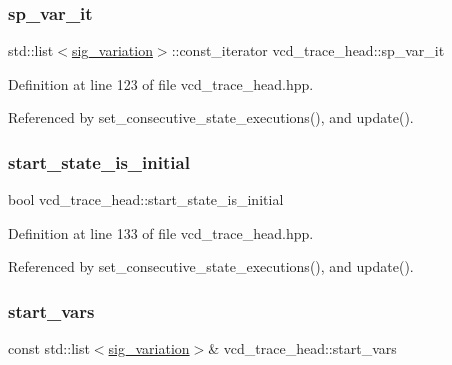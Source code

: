 \subsubsection{\texorpdfstring{sp\+\_\+var\+\_\+it}{sp\_var\_it}}
{\footnotesize\ttfamily std\+::list$<$\hyperlink{structsig__variation}{sig\+\_\+variation}$>$\+::const\+\_\+iterator vcd\+\_\+trace\+\_\+head\+::sp\+\_\+var\+\_\+it}



Definition at line 123 of file vcd\+\_\+trace\+\_\+head.\+hpp.



Referenced by set\+\_\+consecutive\+\_\+state\+\_\+executions(), and update().

\mbox{\label{structvcd__trace__head_a3e61d1aa9602b8820de30b1f1da92298}} 
\subsubsection{\texorpdfstring{start\+\_\+state\+\_\+is\+\_\+initial}{start\_state\_is\_initial}}
{\footnotesize\ttfamily bool vcd\+\_\+trace\+\_\+head\+::start\+\_\+state\+\_\+is\+\_\+initial}



Definition at line 133 of file vcd\+\_\+trace\+\_\+head.\+hpp.



Referenced by set\+\_\+consecutive\+\_\+state\+\_\+executions(), and update().

\mbox{\label{structvcd__trace__head_a500dbaecd7bec2e4601e2d878d075ae5}} 
\subsubsection{\texorpdfstring{start\+\_\+vars}{start\_vars}}
{\footnotesize\ttfamily const std\+::list$<$\hyperlink{structsig__variation}{sig\+\_\+variation}$>$\& vcd\+\_\+trace\+\_\+head\+::start\+\_\+vars}



